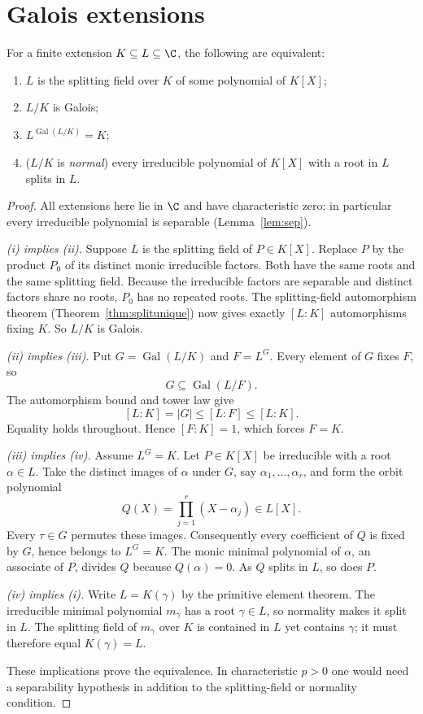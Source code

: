 \section{Galois extensions}

\begin{theorem}\label{thm:galoischar}
For a finite extension $K\subseteq L\subseteq\C$, the following are equivalent:
\begin{enumerate}[label=(\roman*)]
\item $L$ is the splitting field over $K$ of some polynomial of $K[X]$;
\item $L/K$ is Galois;
\item $L^{\operatorname{Gal}(L/K)}=K$;
\item ($L/K$ is \emph{normal}) every irreducible polynomial of $K[X]$ with a root in $L$ splits in $L$.
\end{enumerate}
\end{theorem}
\begin{proof}
All extensions here lie in $\C$ and have characteristic
zero; in particular every irreducible polynomial is
separable (Lemma~\ref{lem:sep}).

\emph{(i) implies (ii).} Suppose $L$ is the splitting
field of $P\in K[X]$. Replace $P$ by the product
$P_0$ of its distinct monic irreducible factors.
Both have the same roots and the same splitting field.
Because the irreducible factors are separable and
distinct factors share no roots, $P_0$ has no
repeated roots. The splitting-field automorphism
theorem (Theorem~\ref{thm:splitunique}) now gives
exactly $[L:K]$ automorphisms fixing $K$.
So $L/K$ is Galois.

\emph{(ii) implies (iii).} Put
$G=\operatorname{Gal}(L/K)$ and $F=L^G$.
Every element of $G$ fixes $F$, so
\[
G\subseteq\operatorname{Gal}(L/F).
\]
The automorphism bound and tower law give
\[
[L:K]=|G|\le[L:F]\le[L:K].
\]
Equality holds throughout. Hence $[F:K]=1$,
which forces $F=K$.

\emph{(iii) implies (iv).} Assume $L^G=K$.
Let $P\in K[X]$ be irreducible with a root
$\alpha\in L$. Take the distinct images of
$\alpha$ under $G$, say $\alpha_1,\ldots,\alpha_r$,
and form the orbit polynomial
\[
Q(X)=\prod_{j=1}^r(X-\alpha_j)\in L[X].
\]
Every $\tau\in G$ permutes these images.
Consequently every coefficient of $Q$ is
fixed by $G$, hence belongs to $L^G=K$.
The monic minimal polynomial of $\alpha$,
an associate of $P$, divides $Q$ because
$Q(\alpha)=0$. As $Q$ splits in $L$,
so does $P$.

\emph{(iv) implies (i).} Write
$L=K(\gamma)$ by the primitive element
theorem. The irreducible minimal polynomial
$m_\gamma$ has a root $\gamma\in L$, so
normality makes it split in $L$.
The splitting field of $m_\gamma$ over
$K$ is contained in $L$ yet contains
$\gamma$; it must therefore equal
$K(\gamma)=L$.

These implications prove the equivalence.
In characteristic $p>0$ one would need
a separability hypothesis in addition to
the splitting-field or normality condition.
\end{proof}


